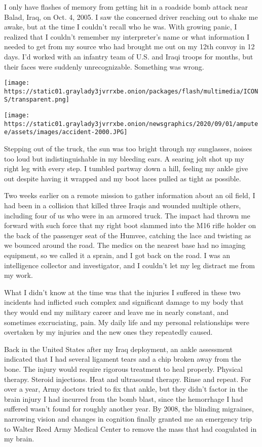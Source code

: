 I only have flashes of memory from getting hit in a roadside bomb attack
near Balad, Iraq, on Oct. 4, 2005. I saw the concerned driver reaching
out to shake me awake, but at the time I couldn't recall who he was.
With growing panic, I realized that I couldn't remember my interpreter's
name or what information I needed to get from my source who had brought
me out on my 12th convoy in 12 days. I'd worked with an infantry team of
U.S. and Iraqi troops for months, but their faces were suddenly
unrecognizable. Something was wrong.

\texttt{[image: https://static01.graylady3jvrrxbe.onion/packages/flash/multimedia/ICONS/transparent.png]}

\texttt{[image: https://static01.graylady3jvrrxbe.onion/newsgraphics/2020/09/01/amputee/assets/images/accident-2000.JPG]}

Stepping out of the truck, the sun was too bright through my sunglasses,
noises too loud but indistinguishable in my bleeding ears. A searing
jolt shot up my right leg with every step. I tumbled partway down a
hill, feeling my ankle give out despite having it wrapped and my boot
laces pulled as tight as possible.

Two weeks earlier on a remote mission to gather information about an oil
field, I had been in a collision that killed three Iraqis and wounded
multiple others, including four of us who were in an armored truck. The
impact had thrown me forward with such force that my right boot slammed
into the M16 rifle holder on the back of the passenger seat of the
Humvee, catching the lace and twisting as we bounced around the road.
The medics on the nearest base had no imaging equipment, so we called it
a sprain, and I got back on the road. I was an intelligence collector
and investigator, and I couldn't let my leg distract me from my work.

What I didn't know at the time was that the injuries I suffered in these
two incidents had inflicted such complex and significant damage to my
body that they would end my military career and leave me in nearly
constant, and sometimes excruciating, pain. My daily life and my
personal relationships were overtaken by my injuries and the new ones
they repeatedly caused.

Back in the United States after my Iraq deployment, an ankle assessment
indicated that I had several ligament tears and a chip broken away from
the bone. The injury would require rigorous treatment to heal properly.
Physical therapy. Steroid injections. Heat and ultrasound therapy. Rinse
and repeat. For over a year, Army doctors tried to fix that ankle, but
they didn't factor in the brain injury I had incurred from the bomb
blast, since the hemorrhage I had suffered wasn't found for roughly
another year. By 2008, the blinding migraines, narrowing vision and
changes in cognition finally granted me an emergency trip to Walter Reed
Army Medical Center to remove the mass that had coagulated in my brain.

